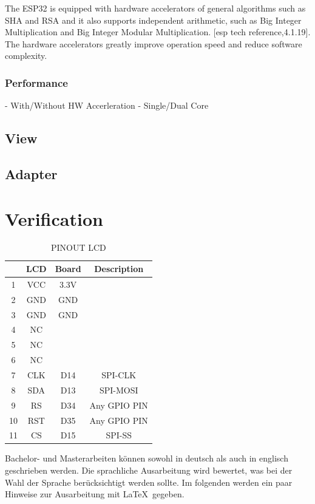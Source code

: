 The ESP32 is equipped with hardware accelerators of general algorithms such as SHA and RSA and it also supports independent arithmetic, such as Big Integer Multiplication and Big Integer Modular Multiplication. [esp tech reference,4.1.19]. The hardware accelerators greatly improve operation speed and reduce software complexity. 

\subsubsection{Performance}
- With/Without HW Accerleration
- Single/Dual Core
\subsection{View}
\subsection{Adapter}

\section{Verification}









\begin{table}[ht]
	\centering
	\begin{tabular}{|c|c|c|c|}
		\hline
		&LCD&Board&Description\\\hline
		1&VCC&3.3V\\\hline
		2&GND&GND\\\hline
		3&GND&GND\\\hline
		4&NC \\\hline
		5&NC \\\hline
		6&NC \\\hline
		7&CLK&D14&SPI-CLK\\\hline
		8&SDA&D13&SPI-MOSI\\\hline
		9&RS&D34&Any GPIO PIN\\\hline
		10&RST&D35&Any GPIO PIN\\\hline
		11&CS&D15&SPI-SS\\\hline
	\end{tabular}
	\caption{PINOUT LCD}
	\label{Tab:PINOUT_LCD}
\end{table}

Bachelor- und Masterarbeiten können sowohl in deutsch als auch in englisch geschrieben werden. 
Die sprachliche Ausarbeitung wird bewertet, was bei der Wahl der Sprache berücksichtigt werden sollte. 
Im folgenden werden ein paar Hinweise zur Ausarbeitung  mit \LaTeX\ gegeben.


